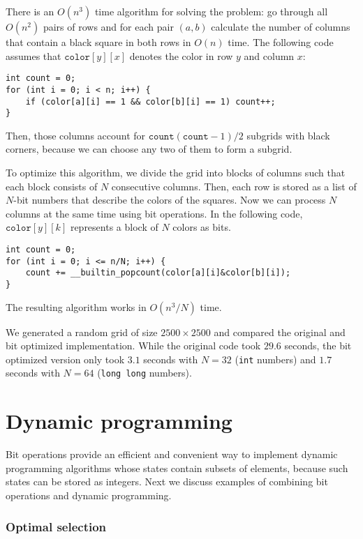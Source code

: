 There is an $O(n^3)$ time algorithm for solving the problem:
go through all $O(n^2)$ pairs of rows and for each pair
$(a,b)$ calculate the number of columns that contain a black
square in both rows in $O(n)$ time.
The following code assumes that $\texttt{color}[y][x]$
denotes the color in row $y$ and column $x$:
\begin{lstlisting}
int count = 0;
for (int i = 0; i < n; i++) {
    if (color[a][i] == 1 && color[b][i] == 1) count++;
}
\end{lstlisting}
Then, those columns
account for $\texttt{count}(\texttt{count}-1)/2$ subgrids with black corners,
because we can choose any two of them to form a subgrid.

To optimize this algorithm, we divide the grid into blocks
of columns such that each block consists of $N$
consecutive columns. Then, each row is stored as
a list of $N$-bit numbers that describe the colors
of the squares. Now we can process $N$ columns at the same time
using bit operations. In the following code,
$\texttt{color}[y][k]$ represents
a block of $N$ colors as bits.
\begin{lstlisting}
int count = 0;
for (int i = 0; i <= n/N; i++) {
    count += __builtin_popcount(color[a][i]&color[b][i]);
}
\end{lstlisting}
The resulting algorithm works in $O(n^3/N)$ time.

We generated a random grid of size $2500 \times 2500$
and compared the original and bit optimized implementation.
While the original code took $29.6$ seconds,
the bit optimized version only took $3.1$ seconds
with $N=32$ (\texttt{int} numbers) and $1.7$ seconds
with $N=64$ (\texttt{long long} numbers).

\section{Dynamic programming}

Bit operations provide an efficient and convenient
way to implement dynamic programming algorithms
whose states contain subsets of elements,
because such states can be stored as integers.
Next we discuss examples of combining
bit operations and dynamic programming.

\subsubsection{Optimal selection}


